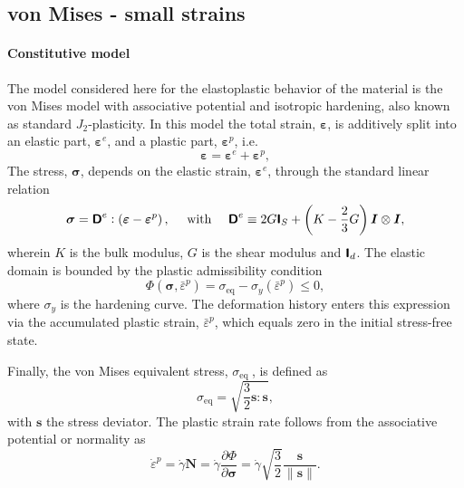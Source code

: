 \subsection{von Mises - small strains}

\paragraph{Constitutive model}
The model considered here for the elastoplastic behavior of the material is the von Mises model with associative potential and isotropic hardening, also known as standard \(J_{2}\)-plasticity.
In this model the total strain, \(\bm \varepsilon\), is additively split into an elastic part, \(\bm \varepsilon^e\), and a plastic part, \(\bm \varepsilon^p\), i.e.
\begin{equation}
\bm \varepsilon=\bm \varepsilon^e+\bm \varepsilon^p,
\end{equation}
The stress, \(\bm\sigma\), depends on the elastic strain, \(\bm \varepsilon^{e}\), through the standard linear relation
\begin{equation}
\bm \sigma=\boldsymbol{\mathsf{D}}^{e}:\left(\bm \varepsilon-\bm\varepsilon^p\right), \quad \text { with } \quad \boldsymbol{\mathsf{D}}^e \equiv 2 G \boldsymbol{\mathsf{I}}_{S}+\left(K-\frac{2}{3} G\right) \boldsymbol{I} \otimes \boldsymbol{I},
\end{equation}
wherein \(K\) is the bulk modulus, \(G\) is the shear modulus and \(\boldsymbol{\mathsf{I}}_d\).
The elastic domain is bounded by the plastic admissibility condition
\begin{equation}
\Phi\left(\bm \sigma, \bar{\varepsilon}^p\right) =\sigma_\text{eq} - \sigma_y(\bar{\varepsilon}^p)\leq 0,
\end{equation}
where \(\sigma_y\) is the hardening curve.
The deformation history enters this expression via the accumulated plastic strain, \(\bar{\varepsilon}^p\), which equals zero in the initial stress-free state.

Finally, the von Mises equivalent stress, \(\sigma_{\text {eq }}\), is defined as
\begin{equation}
\sigma_\text{eq}=\sqrt{\frac{3}{2} \bm s: \bm s},
\end{equation}
with \(\bm s\) the stress deviator.
The plastic strain rate follows from the associative potential or normality as
\begin{equation}
\dot{\varepsilon}^p=\dot{\gamma} \bm{N}=\dot{\gamma} \frac{\partial \Phi}{\partial \boldsymbol{\sigma}}=\dot{\gamma} \sqrt{\frac{3}{2}} \frac{\bm s}{\|\bm s\|}.
\end{equation}

